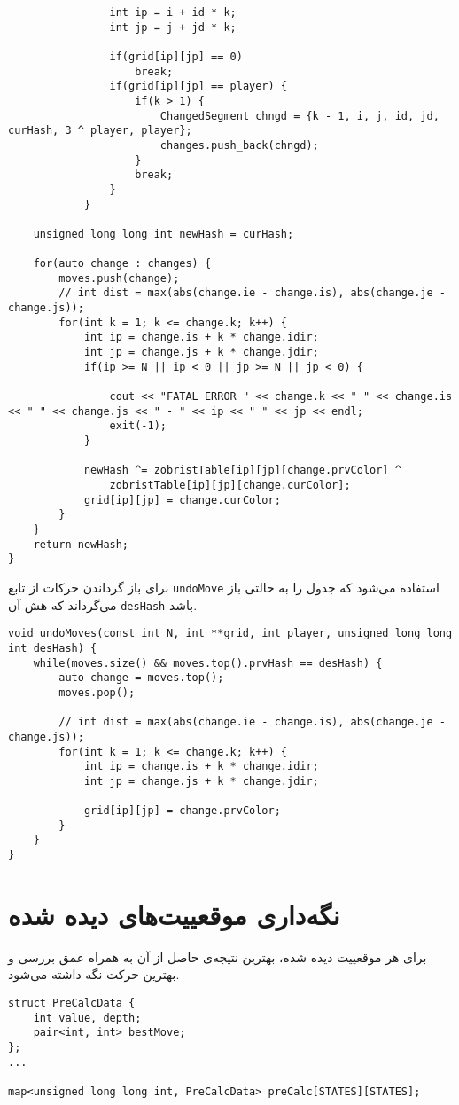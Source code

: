 \begin{latin}
\begin{lstlisting}
				int ip = i + id * k;
				int jp = j + jd * k;

				if(grid[ip][jp] == 0)
					break;
				if(grid[ip][jp] == player) {
					if(k > 1) {
						ChangedSegment chngd = {k - 1, i, j, id, jd, curHash, 3 ^ player, player};
						changes.push_back(chngd);
					}
					break;
				}
			}

	unsigned long long int newHash = curHash;
	
	for(auto change : changes) {
		moves.push(change);
		// int dist = max(abs(change.ie - change.is), abs(change.je - change.js));
		for(int k = 1; k <= change.k; k++) {
			int ip = change.is + k * change.idir;
			int jp = change.js + k * change.jdir;
			if(ip >= N || ip < 0 || jp >= N || jp < 0) {

				cout << "FATAL ERROR " << change.k << " " << change.is << " " << change.js << " - " << ip << " " << jp << endl;
				exit(-1);
			}

			newHash ^= zobristTable[ip][jp][change.prvColor] ^ 
				zobristTable[ip][jp][change.curColor];
			grid[ip][jp] = change.curColor;
		}
	}
	return newHash;
}
\end{lstlisting}
\end{latin}

برای باز گرداندن حرکات از تابع
\verb;undoMove;
استفاده می‌شود که جدول را به حالتی باز می‌گرداند که هش آن
\verb;desHash;
باشد.

\begin{latin}
\begin{lstlisting}
void undoMoves(const int N, int **grid, int player, unsigned long long int desHash) {
	while(moves.size() && moves.top().prvHash == desHash) {
		auto change = moves.top();
		moves.pop();
		
		// int dist = max(abs(change.ie - change.is), abs(change.je - change.js));
		for(int k = 1; k <= change.k; k++) {
			int ip = change.is + k * change.idir;
			int jp = change.js + k * change.jdir;

			grid[ip][jp] = change.prvColor;
		}
	}
}
\end{lstlisting}
\end{latin}


\section{نگه‌داری موقعییت‌ها‌ی دیده شده}
برای هر موقعییت دیده شده، بهترین نتیجه‌ی حاصل از آن به همراه عمق بررسی و بهترین حرکت نگه داشته می‌شود.
\begin{latin}
\begin{lstlisting}
struct PreCalcData {
	int value, depth;
	pair<int, int> bestMove;
};
...

map<unsigned long long int, PreCalcData> preCalc[STATES][STATES];
\end{lstlisting}
\end{latin}

